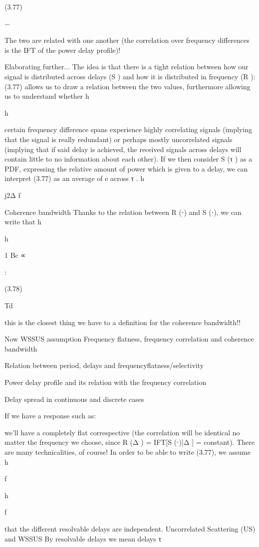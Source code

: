{{{{(3.77)

−\infty

The two are related with one another (the correlation over frequency differences is the IFT of the power delay profile)!

​Elaborating further...
The idea is that there is a tight relation between how our signal is distributed across delays (S ) and how it is distributed in frequency (R ): (3.77) allows us to draw a relation between the two values, furthermore allowing us to understand whether h

h

certain frequency difference spans experience highly correlating signals (implying that the signal is really redundant) or perhaps mostly uncorrelated signals (implying that if said delay is achieved, the received signals across delays will contain little to no information about each other).
If we then consider S (τ ) as a PDF, expressing the relative amount of power which is given to a delay, we can interpret (3.77) as an average of e across τ .
h

j2 Δ f

Coherence bandwidth Thanks to the relation between R (⋅) and S (⋅), we can write that h

h

1 Bc ∝

:

(3.78)

Td

this is the closest thing we have to a definition for the coherence bandwidth!!

Now WSSUS assumption Frequency flatness,
frequency correlation and coherence bandwidth

Relation between period, delays and frequencyflatness/selectivity

Power delay profile and its relation with the frequency correlation

Delay spread in continuous and discrete cases

If we have a response such as:

we'll have a completely flat correspective (the correlation will be identical no matter the frequency we choose, since R (Δ ) = IFT[S (⋅)|Δ ] = constant).
There are many technicalities, of course! In order to be able to write (3.77), we assume h

f

h

f

that the different resolvable delays are independent.
Uncorrelated Scattering (US) and WSSUS By resolvable delays we mean delays τ

}}}}
